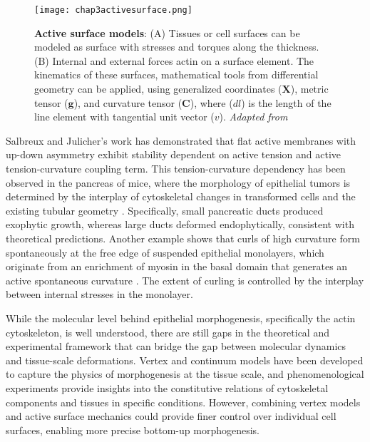 \begin{figure}
	\begin{minipage}[c]{0.5\textwidth}
		\texttt{[image: chap3activesurface.png]}
	\end{minipage}\hfill
	\begin{minipage}[c]{0.45\textwidth}
		\caption{\textbf{Active surface models}: (A) Tissues or cell surfaces can be modeled as surface with stresses and torques along the thickness. (B) Internal and external forces actin on a surface element. The kinematics of these surfaces, mathematical tools from differential geometry can be applied, using generalized coordinates ($\mathbf{X}$), metric tensor ($\mathbf{g}$), and curvature tensor ($\mathbf{C}$), where ($dl$) is the length of the line element with tangential unit vector ($v$). \textit{Adapted from \cite{salbreux2017}}
		} \label{fig_3_9}
	\end{minipage}
\end{figure}





Salbreux and Julicher's work has demonstrated that flat active membranes with up-down asymmetry exhibit stability dependent on active tension and active tension-curvature coupling term. This tension-curvature dependency has been observed in the pancreas of mice, where the morphology of epithelial tumors is determined by the interplay of cytoskeletal changes in transformed cells and the existing tubular geometry \cite{messal2019}. Specifically, small pancreatic ducts produced exophytic growth, whereas large ducts deformed endophytically, consistent with theoretical predictions. Another example shows that curls of high curvature form spontaneously at the free edge of suspended epithelial monolayers, which originate from an enrichment of myosin in the basal domain that generates an active spontaneous curvature \cite{fouchard2020}. The extent of curling is controlled by the interplay between internal stresses in the monolayer.

While the molecular level behind epithelial morphogenesis, specifically the actin cytoskeleton, is well understood, there are still gaps in the theoretical and experimental framework that can bridge the gap between molecular dynamics and tissue-scale deformations. Vertex and continuum models have been developed to capture the physics of morphogenesis at the tissue scale, and phenomenological experiments provide insights into the constitutive relations of cytoskeletal components and tissues in specific conditions. However, combining vertex models and active surface mechanics could provide finer control over individual cell surfaces, enabling more precise bottom-up morphogenesis.